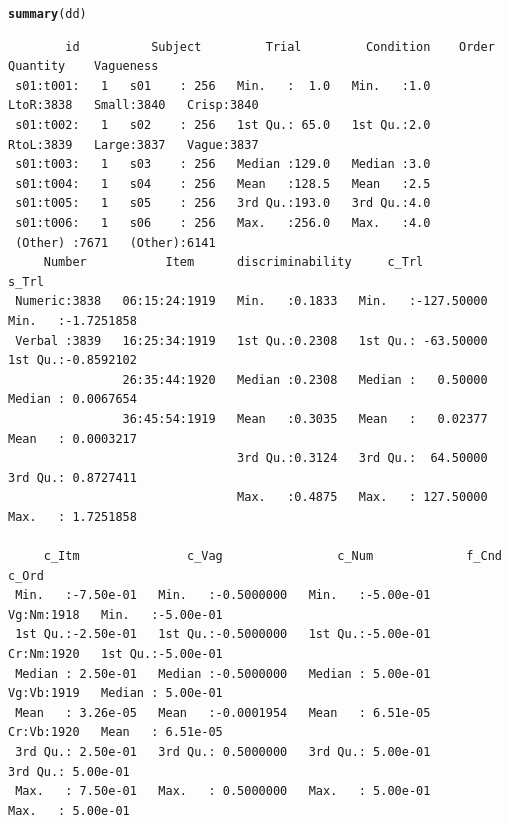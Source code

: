 \documentclass[a4paper,12pt,twoside]{article}\usepackage[]{graphicx}\usepackage[]{color}
\makeatletter
\newcommand{\hlstd}[1]{\textcolor[rgb]{0.345,0.345,0.345}{#1}}%
\newcommand{\hlkwd}[1]{\textcolor[rgb]{0.737,0.353,0.396}{\textbf{#1}}}%
\newenvironment{kframe}{%
 \def\at@end@of@kframe{}%
 \ifinner\ifhmode%
  \def\at@end@of@kframe{\end{minipage}}%
  \begin{minipage}{\columnwidth}%
 \fi\fi%
 \def\FrameCommand##1{\hskip\@totalleftmargin \hskip-\fboxsep
 \colorbox{shadecolor}{##1}\hskip-\fboxsep
     \hskip-\linewidth \hskip-\@totalleftmargin \hskip\columnwidth}%
 \MakeFramed {\advance\hsize-\width
   \@totalleftmargin\z@ \linewidth\hsize
   \@setminipage}}%
 {\par\unskip\endMakeFramed%
 \at@end@of@kframe}
\newenvironment{knitrout}{}{} %
\makeatother
\begin{document}
\clearpage

\begin{knitrout}\scriptsize
{}\color{fgcolor}\begin{kframe}
\begin{alltt}
\hlkwd{summary}\hlstd{(dd)}
\end{alltt}
\begin{verbatim}
        id          Subject         Trial         Condition    Order       Quantity    Vagueness   
 s01:t001:   1   s01    : 256   Min.   :  1.0   Min.   :1.0   LtoR:3838   Small:3840   Crisp:3840  
 s01:t002:   1   s02    : 256   1st Qu.: 65.0   1st Qu.:2.0   RtoL:3839   Large:3837   Vague:3837  
 s01:t003:   1   s03    : 256   Median :129.0   Median :3.0                                        
 s01:t004:   1   s04    : 256   Mean   :128.5   Mean   :2.5                                        
 s01:t005:   1   s05    : 256   3rd Qu.:193.0   3rd Qu.:4.0                                        
 s01:t006:   1   s06    : 256   Max.   :256.0   Max.   :4.0                                        
 (Other) :7671   (Other):6141                                                                      
     Number           Item      discriminability     c_Trl                s_Trl           
 Numeric:3838   06:15:24:1919   Min.   :0.1833   Min.   :-127.50000   Min.   :-1.7251858  
 Verbal :3839   16:25:34:1919   1st Qu.:0.2308   1st Qu.: -63.50000   1st Qu.:-0.8592102  
                26:35:44:1920   Median :0.2308   Median :   0.50000   Median : 0.0067654  
                36:45:54:1919   Mean   :0.3035   Mean   :   0.02377   Mean   : 0.0003217  
                                3rd Qu.:0.3124   3rd Qu.:  64.50000   3rd Qu.: 0.8727411  
                                Max.   :0.4875   Max.   : 127.50000   Max.   : 1.7251858  
                                                                                          
     c_Itm               c_Vag                c_Num             f_Cnd          c_Ord          
 Min.   :-7.50e-01   Min.   :-0.5000000   Min.   :-5.00e-01   Vg:Nm:1918   Min.   :-5.00e-01  
 1st Qu.:-2.50e-01   1st Qu.:-0.5000000   1st Qu.:-5.00e-01   Cr:Nm:1920   1st Qu.:-5.00e-01  
 Median : 2.50e-01   Median :-0.5000000   Median : 5.00e-01   Vg:Vb:1919   Median : 5.00e-01  
 Mean   : 3.26e-05   Mean   :-0.0001954   Mean   : 6.51e-05   Cr:Vb:1920   Mean   : 6.51e-05  
 3rd Qu.: 2.50e-01   3rd Qu.: 0.5000000   3rd Qu.: 5.00e-01                3rd Qu.: 5.00e-01  
 Max.   : 7.50e-01   Max.   : 0.5000000   Max.   : 5.00e-01                Max.   : 5.00e-01  
                                                                                              

\end{verbatim}
\end{kframe}
\end{knitrout}
\end{document}
